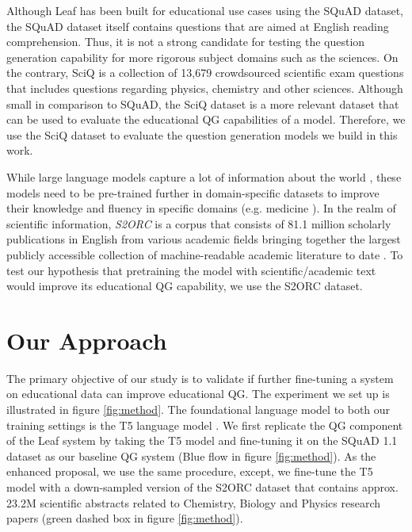 \documentclass[letterpaper]{article} %
\begin{document}
Although Leaf has been built for educational use cases using the SQuAD dataset, the SQuAD dataset itself contains questions that are aimed at English reading comprehension. Thus, it is not a strong candidate for testing the question generation capability for more rigorous subject domains such as the sciences.
On the contrary, SciQ \cite{welbl-etal-2017-crowdsourcing} is a collection of 13,679 crowdsourced scientific exam questions that includes questions regarding physics, chemistry and other sciences. Although small in comparison to SQuAD, the SciQ dataset is a more relevant dataset that can be used to evaluate the educational QG capabilities of a model. Therefore, we use the SciQ dataset to evaluate the question generation models we build in this work.

While large language models capture a lot of information about the world \cite{raffel2020exploring}, these models need to be pre-trained further in domain-specific datasets to improve their knowledge and fluency in specific domains (e.g. medicine \cite{https://doi.org/10.48550/arxiv.2109.04588}). In the realm of scientific information, \emph{S2ORC} is a corpus that consists of 81.1 million scholarly publications in English from various academic fields bringing together the largest publicly accessible collection of machine-readable academic literature to date \cite{lo-etal-2020-s2orc}. To test our hypothesis that pretraining the model with scientific/academic text would improve its educational QG capability, we use the S2ORC dataset.

\section{Our Approach}

The primary objective of our study is to validate if further fine-tuning a system on educational data can improve educational QG. The experiment we set up is illustrated in figure \ref{fig:method}. The foundational language model to both our training settings is the T5 language model \cite{raffel2020exploring}. We first replicate the QG component of the Leaf system \cite{vachev2022leaf} by taking the T5 model and fine-tuning it on the SQuAD 1.1 dataset as our baseline QG system (Blue flow in figure \ref{fig:method}). As the enhanced proposal, we use the same procedure, except, we fine-tune the T5 model with a down-sampled version of the S2ORC dataset  that contains approx. {23.2M} scientific abstracts related to Chemistry, Biology and Physics research papers (green dashed box in figure \ref{fig:method}).
\end{document}
